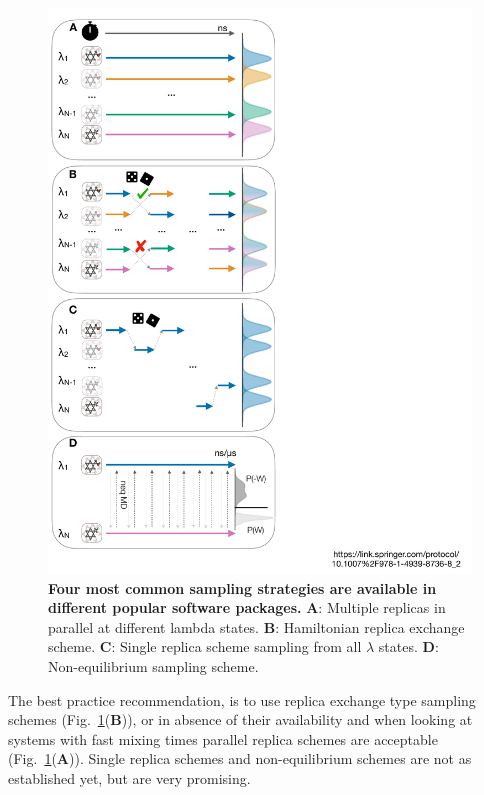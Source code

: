 \documentclass[9pt,bestpractices]{livecoms}
\begin{document}
\begin{figure}
    \includegraphics[width=0.95\columnwidth]{figures/fig8_sampl_scheme/Figure.pdf}
    \caption{\textbf{Four most common sampling strategies are available in different popular software packages.} \textbf{A}: Multiple replicas in parallel at different lambda states. \textbf{B}: Hamiltonian replica exchange scheme. \textbf{C}: Single replica scheme sampling from all $\lambda$ states. \textbf{D}: Non-equilibrium sampling scheme.}
    \label{fig:fig_sampling_scheme}
\end{figure} 
The best practice recommendation, is to use replica exchange type sampling schemes (Fig.~\ref{fig:fig_sampling_scheme}(\textbf{B})), or in absence of their availability and when looking at systems with fast mixing times parallel replica schemes are acceptable (Fig.~\ref{fig:fig_sampling_scheme}(\textbf{A})). Single replica schemes and non-equilibrium schemes are not as established yet, but are very promising.
\end{document}
